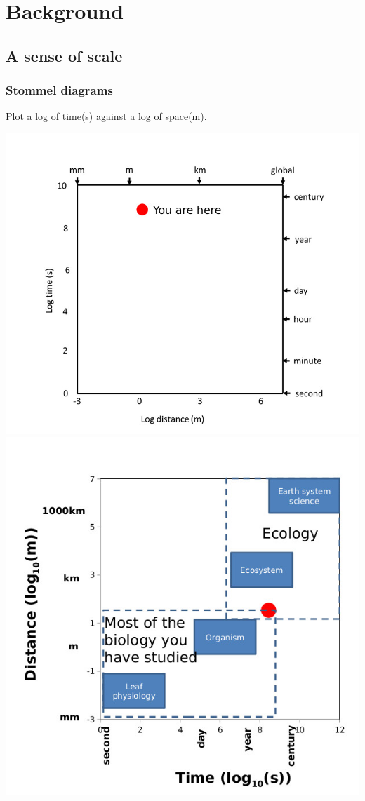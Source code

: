 \documentclass[]{article}
\date{}
\begin{document}
\hypertarget{background}{%
\section{Background}\label{background}}

\hypertarget{a-sense-of-scale}{%
\subsection{A sense of scale}\label{a-sense-of-scale}}

\hypertarget{stommel-diagrams}{%
\subsubsection{Stommel diagrams}\label{stommel-diagrams}}

Plot a log of time(s) against a log of space(m).

\includegraphics{Images/StommelDiagram1.jpg}
\includegraphics{Images/StommelDiagram2.jpg}
\end{document}
